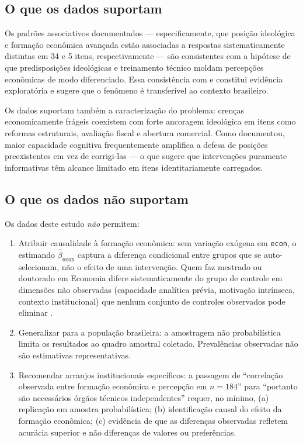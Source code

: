 \subsection*{O que os dados suportam}

Os padrões associativos documentados — especificamente, que posição ideológica e formação econômica avançada estão associadas a respostas sistematicamente distintas em 34 e 5 itens, respectivamente — são consistentes com a hipótese de que predisposições ideológicas e treinamento técnico moldam percepções econômicas de modo diferenciado. Essa consistência com  e  constitui evidência exploratória e sugere que o fenômeno é transferível ao contexto brasileiro.

Os dados suportam também a caracterização do problema: crenças economicamente frágeis coexistem com forte ancoragem ideológica em itens como reformas estruturais, avaliação fiscal e abertura comercial. Como  documentou, maior capacidade cognitiva frequentemente amplifica a defesa de posições preexistentes em vez de corrigi-las — o que sugere que intervenções puramente informativas têm alcance limitado em itens identitariamente carregados.

\subsection*{O que os dados não suportam}

Os dados deste estudo \textit{não} permitem:

\begin{enumerate}[label=\roman*)]
    \item Atribuir causalidade à formação econômica: sem variação exógena em \texttt{econ}, o estimando $\hat{\beta}_{\texttt{econ}}$ captura a diferença condicional entre grupos que se auto-selecionam, não o efeito de uma intervenção. Quem faz mestrado ou doutorado em Economia difere sistematicamente do grupo de controle em dimensões não observadas (capacidade analítica prévia, motivação intrínseca, contexto institucional) que nenhum conjunto de controles observados pode eliminar \cite{angrist2009}.
    \item Generalizar para a população brasileira: a amostragem não probabilística limita os resultados ao quadro amostral coletado. Prevalências observadas não são estimativas representativas.
    \item Recomendar arranjos institucionais específicos: a passagem de ``correlação observada entre formação econômica e percepção em $n=184$'' para ``portanto são necessários órgãos técnicos independentes'' requer, no mínimo, (a) replicação em amostra probabilística; (b) identificação causal do efeito da formação econômica; (c) evidência de que as diferenças observadas refletem acurácia superior e não diferenças de valores ou preferências.
\end{enumerate}

